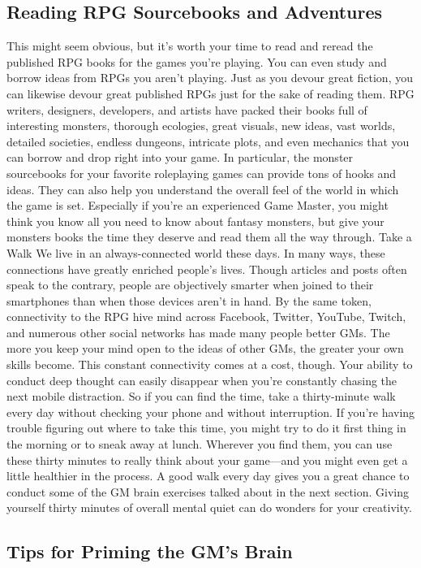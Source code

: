 \documentclass[10pt,a4paper,twoside,bg=print,twocolumn,openany,nodeprecatedcode]{dndbook}
\begin{document}
\subsection{Reading RPG Sourcebooks and Adventures}
This might seem obvious, but it's worth your time to read and reread the published RPG books for the games you're playing. You can even study and borrow ideas from RPGs you aren't playing. Just as you devour great fiction, you can likewise devour great published RPGs just for the sake of reading them. RPG writers, designers, developers, and artists have packed their books full of interesting monsters, thorough ecologies, great visuals, new ideas, vast worlds, detailed societies, endless dungeons, intricate plots, and even mechanics that you can borrow and drop right into your game.
In particular, the monster sourcebooks for your favorite roleplaying games can provide tons of hooks and ideas. They can also help you understand the overall feel of the world in which the game is set. Especially if you're an experienced Game Master, you might think you know all you need to know about fantasy monsters, but give your monsters books the time they deserve and read them all the way through.
Take a Walk
We live in an always-connected world these days. In many ways, these connections have greatly enriched people's lives. Though articles and posts often speak to the contrary, people are objectively smarter when joined to their smartphones than when those devices aren't in hand. By the same token, connectivity to the RPG hive mind across Facebook, Twitter, YouTube, Twitch, and numerous other social networks has made many people better GMs. The more you keep your mind open to the ideas of other GMs, the greater your own skills become.
This constant connectivity comes at a cost, though. Your ability to conduct deep thought can easily disappear when you're constantly chasing the next mobile distraction. So if you can find the time, take a thirty-minute walk every day without checking your phone and without interruption. If you're having trouble figuring out where to take this time, you might try to do it first thing in the morning or to sneak away at lunch.
Wherever you find them, you can use these thirty minutes to really think about your game—and you might even get a little healthier in the process. A good walk every day gives you a great chance to conduct some of the GM brain exercises talked about in the next section. Giving yourself thirty minutes of overall mental quiet can do wonders for your creativity.
\subsection{Tips for Priming the GM's Brain}
\end{document}
